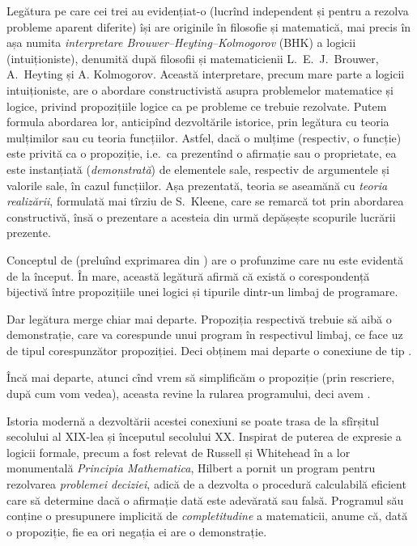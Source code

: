 \documentclass[a4paper]{article}
\begin{document}
Legătura pe care cei trei au evidențiat-o (lucrînd independent și pentru a
rezolva probleme aparent diferite) își are originile în filosofie și matematică,
mai precis în așa numita \emph{interpretare Brouwer--Heyting--Kolmogorov} (BHK)
a logicii (intuiționiste), denumită după filosofii și matematicienii
L.\ E.\ J.\ Brouwer, A.\ Heyting și A. Kolmogorov. Această interpretare, 
precum mare parte a logicii intuiționiste, are o abordare constructivistă 
asupra problemelor matematice și logice, privind propozițiile logice ca pe 
probleme ce trebuie rezolvate. Putem formula abordarea lor, anticipînd
dezvoltările istorice, prin legătura cu teoria mulțimilor sau cu teoria
funcțiilor. Astfel, dacă o mulțime (respectiv, o funcție) este privită ca o
propoziție, i.e.\ ca prezentînd o afirmație sau o proprietate, ea este
instanțiată (\emph{demonstrată}) de elementele sale, respectiv de argumentele
și valorile sale, în cazul funcțiilor. Așa prezentată, teoria se aseamănă
cu \emph{teoria realizării}, formulată mai tîrziu de S.\ Kleene, care se
remarcă tot prin abordarea constructivă, însă o prezentare a acesteia
din urmă depășește scopurile lucrării prezente.

Conceptul de  (preluînd exprimarea din \cite{wad})
are o profunzime care nu este evidentă de la început. În mare, această
legătură afirmă că există o corespondență bijectivă între propozițiile
unei logici și tipurile dintr-un limbaj de programare.

Dar legătura merge chiar mai departe. Propoziția respectivă trebuie să
aibă o demonstrație, care va corespunde unui program în respectivul limbaj, 
ce face uz de tipul corespunzător propoziției. Deci obținem mai departe
o conexiune de tip .

Încă mai departe, atunci cînd vrem să simplificăm o propoziție
(prin rescriere, după cum vom vedea), aceasta revine la rularea programului,
deci avem .

Istoria modernă a dezvoltării acestei conexiuni se poate trasa de la
sfîrșitul secolului al XIX-lea și începutul secolului XX. Inspirat de
puterea de expresie a logicii formale, precum a fost relevat de Russell
și Whitehead în a lor monumentală \emph{Principia Mathematica}, Hilbert
a pornit un program pentru rezolvarea \emph{problemei deciziei},
adică de a dezvolta o procedură calculabilă eficient care să determine dacă
o afirmație dată este adevărată sau falsă. Programul său conține o presupunere
implicită de \emph{completitudine} a matematicii, anume că, dată o propoziție,
fie ea ori negația ei are o demonstrație.
\end{document}
